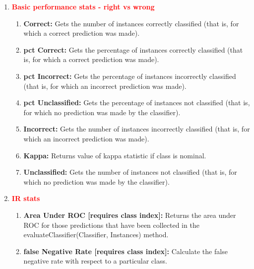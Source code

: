 \documentclass[a4paper,12pt, english]{article}
\begin{document}
\begin{enumerate}

\item \textbf{\textcolor{red}{Basic performance stats - right vs wrong}}
\begin{enumerate}
              
\item \textbf{Correct: }
          Gets the number of instances correctly classified (that is, for which a correct prediction was made).
          
\item \textbf{pct Correct: }
          Gets the percentage of instances correctly classified (that is, for which a correct prediction was made). 

\item \textbf{pct Incorrect: }
          Gets the percentage of instances incorrectly classified (that is, for which an incorrect prediction was made).

\item \textbf{pct Unclassified: }
          Gets the percentage of instances not classified (that is, for which no prediction was made by the classifier). 

\item \textbf{Incorrect: }
          Gets the number of instances incorrectly classified (that is, for which an incorrect prediction was made). 
          
\item \textbf{Kappa: }
          Returns value of kappa statistic if class is nominal. 
          
\item \textbf{Unclassified: }
          Gets the number of instances not classified (that is, for which no prediction was made by the classifier).
\end{enumerate}    

\item  \textbf{\textcolor{red}{IR stats}}
\begin{enumerate}          
\item \textbf{Area Under ROC  [requires class index]: }
          Returns the area under ROC for those predictions that have been collected in the evaluateClassifier(Classifier, Instances) method. 
          
\item \textbf{false Negative Rate [requires class index]: }
          Calculate the false negative rate with respect to a particular class. 
          

\end{enumerate}
\end{enumerate}
\end{document}
